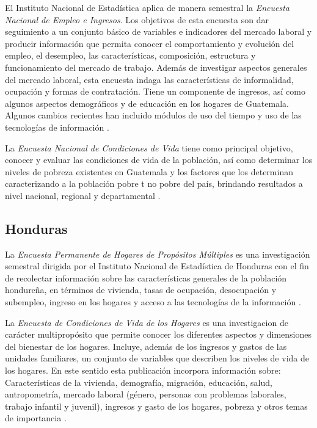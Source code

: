 \documentclass[12pt,spanish,]{book}
\begin{document}
El Instituto Nacional de Estadística aplica de manera semestral la \emph{Encuesta Nacional de Empleo e Ingresos}. Los objetivos de esta encuesta son dar seguimiento a un conjunto básico de variables e indicadores del mercado laboral y producir información que permita conocer el comportamiento y evolución del empleo, el desempleo, las características, composición, estructura y funcionamiento del mercado de trabajo. Además de investigar aspectos generales del mercado laboral, esta encuesta indaga las características de informalidad, ocupación y formas de contratación. Tiene un componente de ingresos, así como algunos aspectos demográficos y de educación en los hogares de Guatemala. Algunos cambios recientes han incluido módulos de uso del tiempo y uso de las tecnologías de información \autocite{INE-GT}.

La \emph{Encuesta Nacional de Condiciones de Vida} tiene como principal objetivo, conocer y evaluar las condiciones de vida de la población, así como determinar los niveles de pobreza existentes en Guatemala y los factores que los determinan caracterizando a la población pobre t no pobre del país, brindando resultados a nivel nacional, regional y departamental \autocite{INE2-GT}.

\hypertarget{honduras}{%
\subsection*{Honduras}\label{honduras}}

La \emph{Encuesta Permanente de Hogares de Propósitos Múltiples} es una investigación semestral dirigida por el Instituto Nacional de Estadística de Honduras con el fin de recolectar información sobre las características generales de la población hondureña, en términos de vivienda, tasas de ocupación, desocupación y subempleo, ingreso en los hogares y acceso a las tecnologías de la información \autocite{INE-HN}.

La \emph{Encuesta de Condiciones de Vida de los Hogares} es una investigacion de carácter multipropósito que permite conocer los diferentes aspectos y dimensiones del bienestar de los hogares. Incluye, además de los ingresos y gastos de las unidades familiares, un conjunto de variables que describen los niveles de vida de los hogares. En este sentido esta publicación incorpora información sobre: Características de la vivienda, demografía, migración, educación, salud, antropometría, mercado laboral (género, personas con problemas laborales, trabajo infantil y juvenil), ingresos y gasto de los hogares, pobreza y otros temas de importancia \autocite{INE2-HN}.
\end{document}
